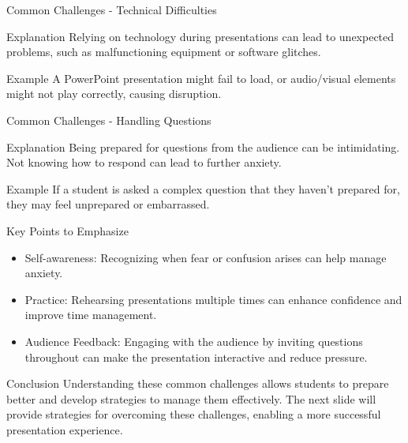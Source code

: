 \documentclass[aspectratio=169]{beamer}
\begin{document}
\begin{frame}[fragile]{Common Challenges - Technical Difficulties}
    \begin{block}{Explanation}
        Relying on technology during presentations can lead to unexpected problems, such as malfunctioning equipment or software glitches.
    \end{block}
    \begin{block}{Example}
        A PowerPoint presentation might fail to load, or audio/visual elements might not play correctly, causing disruption.
    \end{block}
\end{frame}

\begin{frame}[fragile]{Common Challenges - Handling Questions}
    \begin{block}{Explanation}
        Being prepared for questions from the audience can be intimidating. Not knowing how to respond can lead to further anxiety.
    \end{block}
    \begin{block}{Example}
        If a student is asked a complex question that they haven't prepared for, they may feel unprepared or embarrassed.
    \end{block}
\end{frame}

\begin{frame}[fragile]{Key Points to Emphasize}
    \begin{itemize}
        \item Self-awareness: Recognizing when fear or confusion arises can help manage anxiety.
        \item Practice: Rehearsing presentations multiple times can enhance confidence and improve time management.
        \item Audience Feedback: Engaging with the audience by inviting questions throughout can make the presentation interactive and reduce pressure.
    \end{itemize}
\end{frame}

\begin{frame}[fragile]{Conclusion}
    Understanding these common challenges allows students to prepare better and develop strategies to manage them effectively. The next slide will provide strategies for overcoming these challenges, enabling a more successful presentation experience.
\end{frame}
\end{document}
